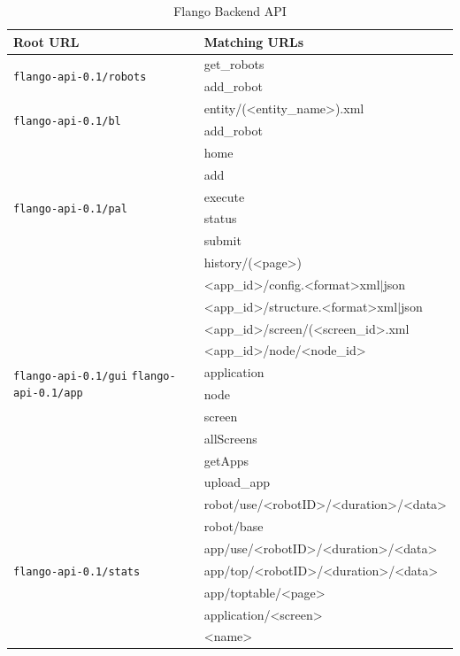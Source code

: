 \begin{table}[ht]
    \centering
    \begin{tabularx}{\linewidth}{| l | X |}
    \hline
    Root URL & Matching URLs \\
    \hline
    \multirow{2}{*}{\texttt{flango-api-0.1/robots}}
        & get\_robots \\ 
        & add\_robot \\
    \hline 
    
    \multirow{2}{*}{\texttt{flango-api-0.1/bl}} 
        & entity/(\textless entity\_name\textgreater).xml \\ 
        & add\_robot \\
    \hline
    
    \multirow{6}{*}{\texttt{flango-api-0.1/pal}} 
        & home \\
        & add \\
        & execute \\
        & status \\   
        & submit \\
        & history/(\textless page\textgreater) \\
    \hline
    
    \multirow{10}{2.5cm}{\texttt{flango-api-0.1/gui}  \texttt{flango-api-0.1/app}}
        & \textless app\_id\textgreater /config.\textless format\textgreater xml$|$json \\
        & \textless app\_id\textgreater /structure.\textless format\textgreater xml$|$json \\
        & \textless app\_id\textgreater /screen/(\textless screen\_id\textgreater.xml \\
        & \textless app\_id\textgreater /node/\textless node\_id\textgreater \\
        & application \\
        & node \\
        & screen \\
        & allScreens \\
        & getApps \\
        & upload\_app \\
    \hline
    
    \multirow{7}{*}{\texttt{flango-api-0.1/stats}}
        & robot/use/\textless robotID>/\textless duration\textgreater/<data\textgreater \\
        & robot/base \\
        & app/use/\textless robotID\textgreater/\textless duration\textgreater/<data\textgreater \\
        & app/top/\textless robotID\textgreater/\textless duration\textgreater/<data\textgreater \\
        & app/toptable/\textless page\textgreater \\
        & application/\textless screen\textgreater \\
        & <name> \\
    \hline
    \end{tabularx}
    \caption{Flango Backend API}
    \label{tab:flango-api}
\end{table}
